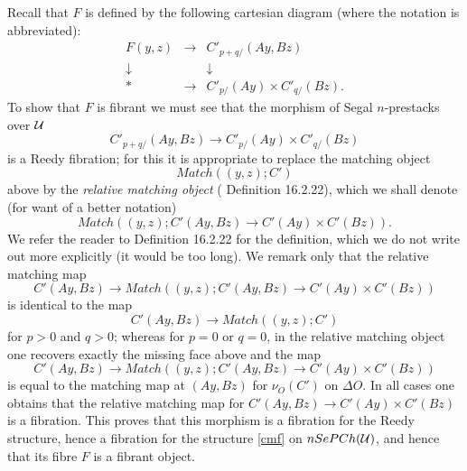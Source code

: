 Recall that $F$ is defined by the following cartesian diagram
(where the notation is abbreviated):
$$
\begin{array}{ccc}
F(y,z) & \rightarrow & C'_{p+q/}(Ay,
Bz)\\
\downarrow && \downarrow \\
\ast & \rightarrow & C'_{p/}(Ay)\times
C'_{q/}(Bz).
\end{array}
$$
To show that
$F$ is fibrant we must see that the morphism of Segal $n$-prestacks
over ${\cal U}$
$$
C'_{p+q/}(Ay, Bz)\rightarrow C'_{p/}(Ay)\times
C'_{q/}(Bz)
$$
is a Reedy fibration; for this it is appropriate
to replace the matching object
$$
Match((y,z);C')
$$
above by the \emph{relative matching object}
(\cite{Hirschhorn} Definition 16.2.22),
which we shall denote (for want of a better notation)
$$
Match((y,z);
C'(Ay,Bz)\rightarrow C'(Ay)\times C'(Bz)).
$$
We refer the reader to
\cite{Hirschhorn} Definition 16.2.22 for the definition, which we
do not write out more explicitly (it would be too long).
We remark only that the relative matching map
$$
C'(Ay,Bz)\rightarrow Match((y,z);
C'(Ay,Bz)\rightarrow C'(Ay)\times C'(Bz))
$$
is identical to the map
$$
C'(Ay,Bz)\rightarrow Match((y,z);C')
$$
for $p>0$ and $q>0$; whereas for $p=0$ or $q=0$, in the relative matching
object one recovers exactly the missing face above and the map
$$
C'(Ay,Bz)\rightarrow Match((y,z);
C'(Ay,Bz)\rightarrow C'(Ay)\times C'(Bz))
$$
is equal to the matching map at $(Ay,Bz)$ for $\nu _O(C')$ on
$\Delta O$. In all cases one obtains that the relative matching map
for $C'(Ay,Bz)\rightarrow C'(Ay)\times C'(Bz)$ is a fibration. This proves
that this morphism is a fibration for
the Reedy structure, hence a fibration for the
structure \ref{cmf} on $nSePCh({\cal U} )$, and hence that its fibre $F$ is
a fibrant object.
